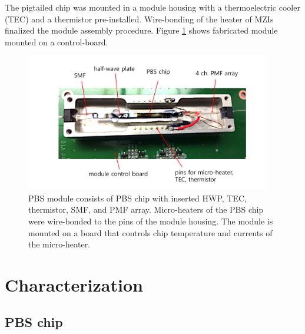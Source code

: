 \documentclass[letterpaper, 10pt]{article}
\begin{document}
The pigtailed chip was mounted in a module housing with a thermoelectric cooler (TEC) and a thermistor pre-installed.
Wire-bonding of the heater of MZIs finalized the module assembly procedure.
Figure \ref{fig:module} shows fabricated module mounted on a control-board.
\begin{figure}
  \centering
  \includegraphics[height=6cm]{module.pdf}
  \caption{PBS module consists of PBS chip with inserted HWP, TEC, thermistor, SMF, and PMF array. Micro-heaters of the PBS chip were wire-bonded to the pins of the module housing. The module is mounted on a board that controls chip temperature and currents of the micro-heater.}
  \label{fig:module}
\end{figure}

\section{Characterization}
\subsection{PBS chip}
\end{document}
